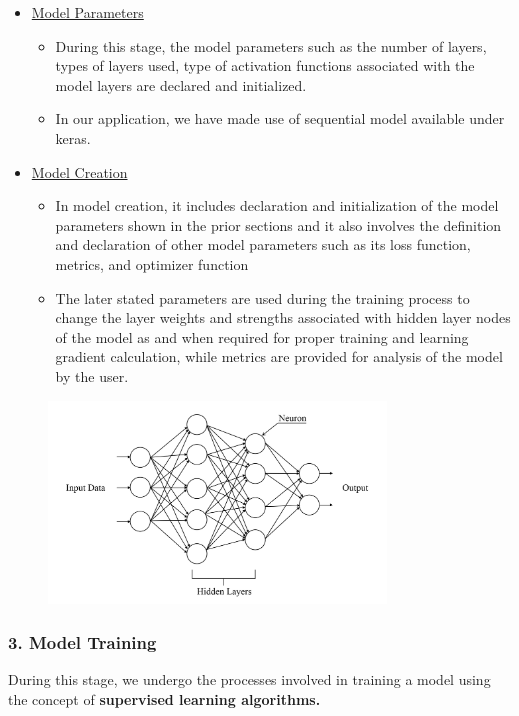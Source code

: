 \begin{itemize}
  \item \underline{Model Parameters}
    \begin{itemize}
      \item During this stage, the model parameters such as the number of layers, types of layers used, type of activation functions associated with the model layers are declared and initialized.
      \item In our application, we have made use of sequential model available under keras.
    \end{itemize}
  \item \underline{Model Creation}
    \begin{itemize}
      \item In model creation, it includes declaration and initialization of the model parameters shown in the prior sections and it also involves the definition and declaration of other model parameters such as its loss function, metrics, and optimizer function
      \item The later stated parameters are used during the training process to change the layer weights and strengths associated with hidden layer nodes of the model as and when required for proper training and learning gradient calculation, while metrics are provided for analysis of the model by the user.
    \end{itemize}
\end{itemize}
\begin{figure}[H]
  \centering
  \includegraphics[width=0.8\textwidth]{images/NN.png}
\end{figure}



\subsubsection*{3. Model Training}
\noindent During this stage, we undergo the processes involved in training a model using the concept of \textbf{supervised learning algorithms.}

